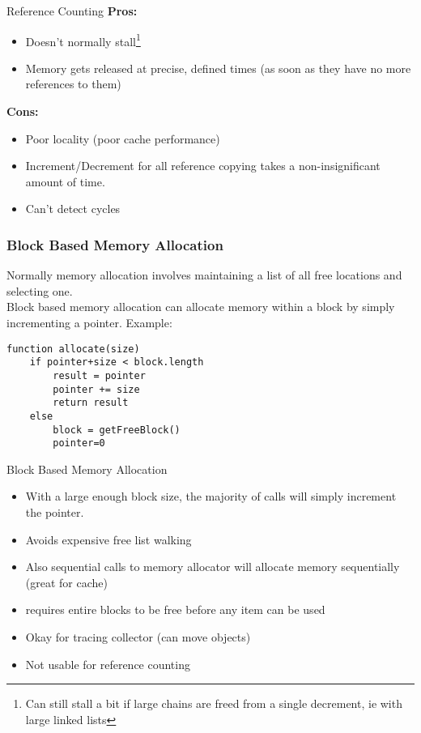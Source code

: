 \documentclass{beamer}
\begin{document}
\begin{frame}{Reference Counting}
	\textbf{Pros:}
	\begin{itemize}
		\item Doesn't normally stall\footnote{Can still stall a bit if large chains are freed from a single decrement, ie with large linked lists}
		\item Memory gets released at precise, defined times (as soon as they have no more references to them)
	\end{itemize}
	\textbf{Cons:}
	\begin{itemize}
		\item Poor locality (poor cache performance)
		\item Increment/Decrement for all reference copying takes a non-insignificant amount of time.
		\item Can't detect cycles
	\end{itemize}
\end{frame}


\begin{frame}[fragile]
\frametitle{Block Based Memory Allocation}
	Normally memory allocation involves maintaining a list of all free locations and selecting one.\\
	
	Block based memory allocation can allocate memory within a block by simply incrementing a pointer. Example:
\begin{lstlisting}[caption=Bump Pointer Memory Allocation]
function allocate(size)
    if pointer+size < block.length
        result = pointer
        pointer += size
        return result
    else
        block = getFreeBlock()
        pointer=0
\end{lstlisting}

\end{frame}

\begin{frame}{Block Based Memory Allocation}
	\begin{itemize}
		\item With a large enough block size, the majority of calls will simply increment the pointer.
		\item Avoids expensive free list walking
		\item Also sequential calls to memory allocator will allocate memory sequentially (great for cache)
		\pause
		\item requires entire blocks to be free before any item can be used
		\pause
		\item Okay for tracing collector (can move objects)
		\pause
		\item Not usable for reference counting
	\end{itemize}
\end{frame}
\end{document}
